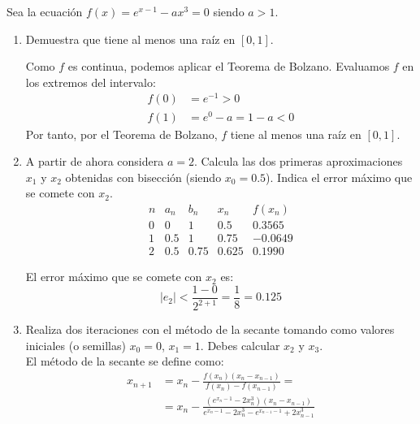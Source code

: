 \begin{ejercicio}
    Sea la ecuación $f(x) = e^{x-1} - ax^3 = 0$ siendo $a > 1$.
    \begin{enumerate}
        \item Demuestra que tiene al menos una raíz en $[0, 1]$.
        
        Como $f$ es continua, podemos aplicar el Teorema de Bolzano. Evaluamos $f$ en los extremos del intervalo:
        \begin{align*}
            f(0) &= e^{-1} > 0\\
            f(1) &= e^0 - a = 1 - a < 0
        \end{align*}
        Por tanto, por el Teorema de Bolzano, $f$ tiene al menos una raíz en $[0, 1]$.
        \item A partir de ahora considera $a = 2$. Calcula las dos primeras aproximaciones $x_1$ y $x_2$ obtenidas con bisección (siendo $x_0 = 0.5$). Indica el error máximo que se comete con $x_2$.
        \begin{equation*}
            \begin{array}{c|c|c|c|c}
                n & a_n & b_n & x_n & f(x_n) \\ \hline
                0 & 0 & 1 & 0.5 & 0.3565\\
                1 & 0.5 & 1 & 0.75 & -0.0649\\
                2 & 0.5 & 0.75 & 0.625 & 0.1990
            \end{array}
        \end{equation*}

        El error máximo que se comete con $x_2$ es:
        \begin{equation*}
            |e_2| < \dfrac{1-0}{2^{2+1}} = \dfrac{1}{8} = 0.125
        \end{equation*}
        \item Realiza dos iteraciones con el método de la secante tomando como valores iniciales (o semillas) $x_0 = 0$, $x_1 = 1$. Debes calcular $x_2$ y $x_3$.\\
        
        El método de la secante se define como:
        \begin{align*}
            x_{n+1} &= x_n - \frac{f(x_n)(x_n - x_{n-1})}{f(x_n) - f(x_{n-1})}
            =\\&= 
            x_n - \frac{(e^{x_n-1} - 2x_n^3)(x_n - x_{n-1})}{e^{x_n-1} - 2x_n^3 - e^{x_{n-1}-1} + 2x_{n-1}^3}
        \end{align*}


\end{enumerate}
\end{ejercicio}
